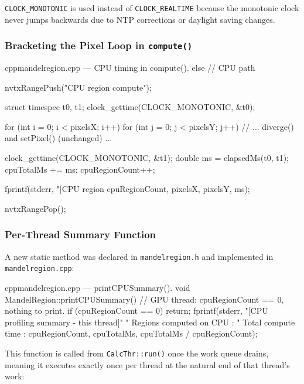 \documentclass[
	english,
	letterpaper, oneside
]{article}
\begin{document}
\texttt{CLOCK\_MONOTONIC} is used instead of \texttt{CLOCK\_REALTIME}
because the monotonic clock never jumps backwards due to NTP corrections
or daylight saving changes.

\subsubsection{Bracketing the Pixel Loop in \texttt{compute()}}

\begin{sourcecode}{cpp}{mandelregion.cpp — CPU timing in compute().}
else // CPU path
{
    nvtxRangePush("CPU region compute");

    struct timespec t0, t1;
    clock_gettime(CLOCK_MONOTONIC, &t0);

    for (int i = 0; i < pixelsX; i++)
        for (int j = 0; j < pixelsY; j++)
        {
            // ... diverge() and setPixel() (unchanged) ...
        }

    clock_gettime(CLOCK_MONOTONIC, &t1);
    double ms = elapsedMs(t0, t1);
    cpuTotalMs += ms;
    cpuRegionCount++;

    fprintf(stderr,
        "[CPU region %
        cpuRegionCount, pixelsX, pixelsY, ms);

    nvtxRangePop();
}
\end{sourcecode}

\subsubsection{Per-Thread Summary Function}

A new static method was declared in \texttt{mandelregion.h} and
implemented in \texttt{mandelregion.cpp}:

\begin{sourcecode}{cpp}{mandelregion.cpp — printCPUSummary().}
void MandelRegion::printCPUSummary()
{
    // GPU thread: cpuRegionCount == 0, nothing to print.
    if (cpuRegionCount == 0) return;
    fprintf(stderr,
        "[CPU profiling summary - this thread]\n"
        "  Regions computed on CPU : %
        "  Total compute time      : %
        cpuRegionCount,
        cpuTotalMs, cpuTotalMs / cpuRegionCount);
}
\end{sourcecode}

This function is called from \texttt{CalcThr::run()} once the work queue
drains, meaning it executes exactly once per thread at the natural end of
that thread's work:
\end{document}
